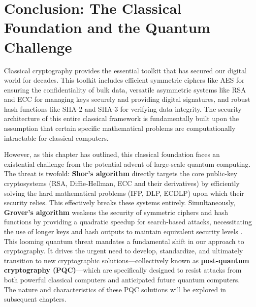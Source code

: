 
\section{Conclusion: The Classical Foundation and the Quantum Challenge}

Classical cryptography provides the essential toolkit that has secured our digital world for decades. This toolkit includes efficient symmetric ciphers like AES for ensuring the confidentiality of bulk data, versatile asymmetric systems like RSA and ECC for managing keys securely and providing digital signatures, and robust hash functions like SHA-2 and SHA-3 for verifying data integrity. The security architecture of this entire classical framework is fundamentally built upon the assumption that certain specific mathematical problems are computationally intractable for classical computers.

However, as this chapter has outlined, this classical foundation faces an existential challenge from the potential advent of large-scale quantum computing. The threat is twofold: \textbf{Shor's algorithm} directly targets the core public-key cryptosystems (RSA, Diffie-Hellman, ECC and their derivatives) by efficiently solving the hard mathematical problems (IFP, DLP, ECDLP) upon which their security relies. This effectively breaks these systems entirely. Simultaneously, \textbf{Grover's algorithm} weakens the security of symmetric ciphers and hash functions by providing a quadratic speedup for search-based attacks, necessitating the use of longer keys and hash outputs to maintain equivalent security levels \parencite{bernstein2017post, mosca2018cybersecurity}. This looming quantum threat mandates a fundamental shift in our approach to cryptography. It drives the urgent need to develop, standardize, and ultimately transition to new cryptographic solutions—collectively known as \textbf{post-quantum cryptography (PQC)}—which are specifically designed to resist attacks from both powerful classical computers and anticipated future quantum computers. The nature and characteristics of these PQC solutions will be explored in subsequent chapters.